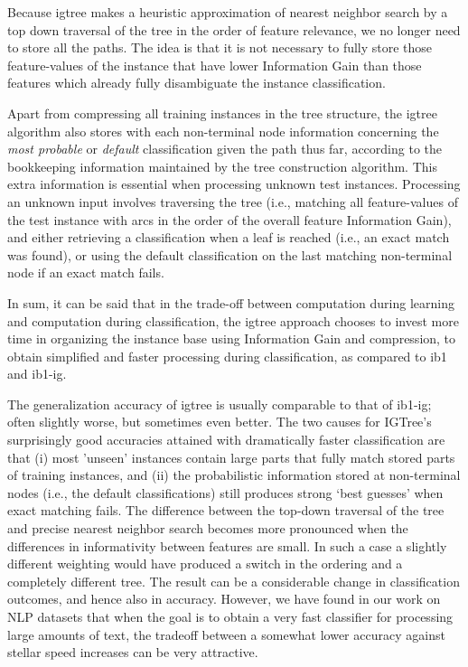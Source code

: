 \documentclass{report}
\begin{document}
Because {\sc igtree} makes a heuristic approximation of nearest
neighbor search by a top down traversal of the tree in the order of
feature relevance, we no longer need to store all the paths. The idea
is that it is not necessary to fully store those feature-values of the
instance that have lower Information Gain than those features which
already fully disambiguate the instance classification.

Apart from compressing all training instances in the tree structure,
the {\sc igtree} algorithm also stores with each non-terminal node
information concerning the {\em most probable} or {\em default}
classification given the path thus far, according to the bookkeeping
information maintained by the tree construction algorithm. This extra
information is essential when processing unknown test instances.
Processing an unknown input involves traversing the tree (i.e.,
matching all feature-values of the test instance with arcs in the
order of the overall feature Information Gain), and either retrieving
a classification when a leaf is reached (i.e., an exact match was
found), or using the default classification on the last matching
non-terminal node if an exact match fails.

In sum, it can be said that in the trade-off between computation
during learning and computation during classification, the {\sc
igtree} approach chooses to invest more time in organizing the
instance base using Information Gain and compression, to obtain
simplified and faster processing during classification,
as compared to {\sc ib1} and {\sc ib1-ig}.

The generalization accuracy of {\sc igtree} is usually comparable to
that of {\sc ib1-ig}; often slightly worse, but sometimes even better.
The two causes for {\sc IGTree}'s surprisingly good accuracies
attained with dramatically faster classification are that (i) most
'unseen' instances contain large parts that fully match stored parts
of training instances, and (ii) the probabilistic information stored
at non-terminal nodes (i.e., the default classifications) still
produces strong `best guesses' when exact matching fails. The
difference between the top-down traversal of the tree and precise
nearest neighbor search becomes more pronounced when the differences
in informativity between features are small. In such a case a slightly
different weighting would have produced a switch in the ordering and a
completely different tree. The result can be a considerable change in
classification outcomes, and hence also in accuracy. However, we have
found in our work on NLP datasets that when the goal is to obtain a
very fast classifier for processing large amounts of text, the
tradeoff between a somewhat lower accuracy against stellar speed
increases can be very attractive.
\end{document}
